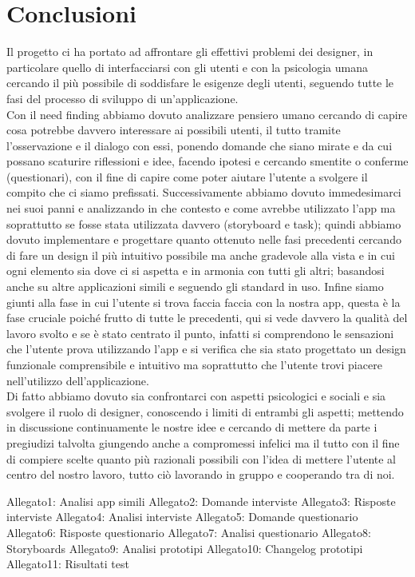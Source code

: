 \documentclass{article}
\begin{document}
\section{Conclusioni}
Il progetto ci ha portato ad affrontare gli effettivi problemi dei designer, in particolare quello di interfacciarsi con gli utenti e con la psicologia umana cercando il più possibile di soddisfare le esigenze degli utenti, seguendo tutte le fasi del processo di sviluppo di un'applicazione.
\\\indent
Con il need finding abbiamo dovuto analizzare pensiero umano cercando di capire cosa potrebbe davvero interessare ai possibili utenti, il tutto tramite l’osservazione e il dialogo con essi, ponendo domande che siano mirate e da cui possano scaturire riflessioni e idee, facendo ipotesi e cercando smentite o conferme (questionari), con il fine di capire come poter aiutare l’utente a svolgere il compito che ci siamo prefissati. Successivamente abbiamo dovuto immedesimarci nei suoi panni e analizzando in che contesto e come avrebbe utilizzato l’app ma soprattutto se fosse stata utilizzata davvero (storyboard e task); quindi abbiamo dovuto implementare e progettare quanto ottenuto nelle fasi precedenti cercando di fare un design il più intuitivo possibile ma anche gradevole alla vista e in cui ogni elemento sia dove ci si aspetta e in armonia con tutti gli altri; basandosi anche su altre applicazioni simili e seguendo gli standard in uso. Infine siamo giunti alla fase in cui l’utente si trova faccia faccia con la nostra app, questa è la fase cruciale poiché frutto di tutte le precedenti, qui si vede davvero la qualità del lavoro svolto e se è stato centrato il punto, infatti si comprendono le sensazioni che l’utente prova utilizzando l’app e si verifica che sia stato progettato un design funzionale comprensibile e intuitivo ma soprattutto che l’utente trovi piacere nell’utilizzo dell’applicazione.
\\\indent
Di fatto abbiamo dovuto sia confrontarci con aspetti psicologici e sociali e sia svolgere il ruolo di designer, conoscendo i limiti di entrambi gli aspetti; mettendo in discussione continuamente le nostre idee e cercando di mettere da parte i pregiudizi talvolta giungendo anche a compromessi infelici ma il tutto con il fine di compiere scelte quanto più razionali possibili con l’idea di mettere l’utente al centro del nostro lavoro, tutto ciò lavorando in gruppo e cooperando tra di noi. 



\begin{thebibliography}{}
 Allegato1: Analisi app simili
 Allegato2: Domande interviste
 Allegato3: Risposte interviste
 Allegato4: Analisi interviste
 Allegato5: Domande questionario
 Allegato6: Risposte questionario
 Allegato7: Analisi questionario
 Allegato8: Storyboards
 Allegato9: Analisi prototipi
 Allegato10: Changelog prototipi
 Allegato11: Risultati test
\end{thebibliography}
\end{document}

